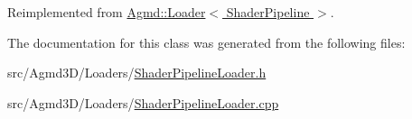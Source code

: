 Reimplemented from \hyperlink{class_agmd_1_1_loader_abf633648c648f0c6152a559c3e4be682}{Agmd\+::\+Loader$<$ Shader\+Pipeline $>$}.



The documentation for this class was generated from the following files\+:\begin{DoxyCompactItemize}
\item 
src/\+Agmd3\+D/\+Loaders/\hyperlink{_shader_pipeline_loader_8h}{Shader\+Pipeline\+Loader.\+h}\item 
src/\+Agmd3\+D/\+Loaders/\hyperlink{_shader_pipeline_loader_8cpp}{Shader\+Pipeline\+Loader.\+cpp}\end{DoxyCompactItemize}
